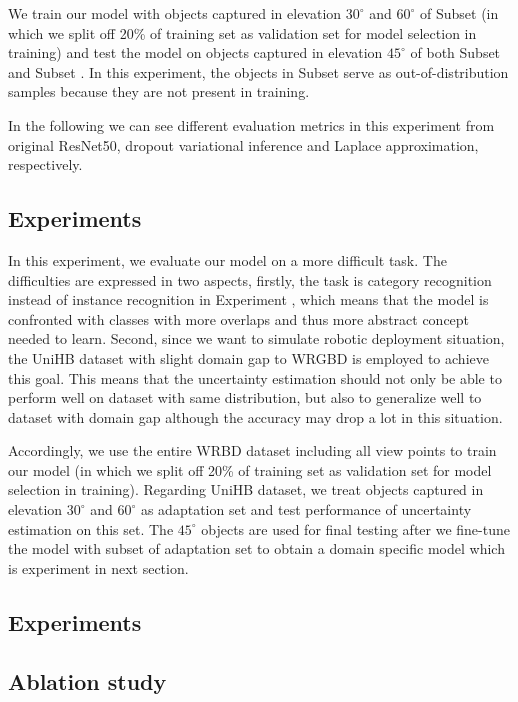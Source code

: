 We train our model with objects captured in elevation $30^\circ$ and $60^\circ$ of Subset  (in which we split off 20\% of training set as validation set for model selection in training) and test the model on objects captured in elevation $45^\circ$ of both Subset  and Subset . In this experiment, the objects in Subset  serve as out-of-distribution samples because they are not present in training.

In the following we can see different evaluation metrics in this experiment from original ResNet50, dropout variational inference and Laplace approximation, respectively.


\subsection{Experiments }
In this experiment, we evaluate our model on a more difficult task. The difficulties are expressed in two aspects, firstly, the task is category recognition instead of instance recognition in Experiment , which means that the model is confronted with classes with more overlaps and thus more abstract concept needed to learn. Second, since we want to simulate robotic deployment situation, the UniHB dataset with slight domain gap to WRGBD is employed to achieve this goal. This means that the uncertainty estimation should not only be able to perform well on dataset with same distribution, but also to generalize well to dataset with domain gap although the accuracy may drop a lot in this situation.

Accordingly, we use the entire WRBD dataset including all view points to train our model (in which we split off 20\% of training set as validation set for model selection in training). Regarding UniHB dataset, we treat objects captured in elevation $30^\circ$ and $60^\circ$ as adaptation set and test performance of uncertainty estimation on this set. The $45^\circ$ objects are used for final testing after we fine-tune the model with subset of adaptation set to obtain a domain specific model which is experiment in next section.

\subsection{Experiments }


\subsection{Ablation study}

